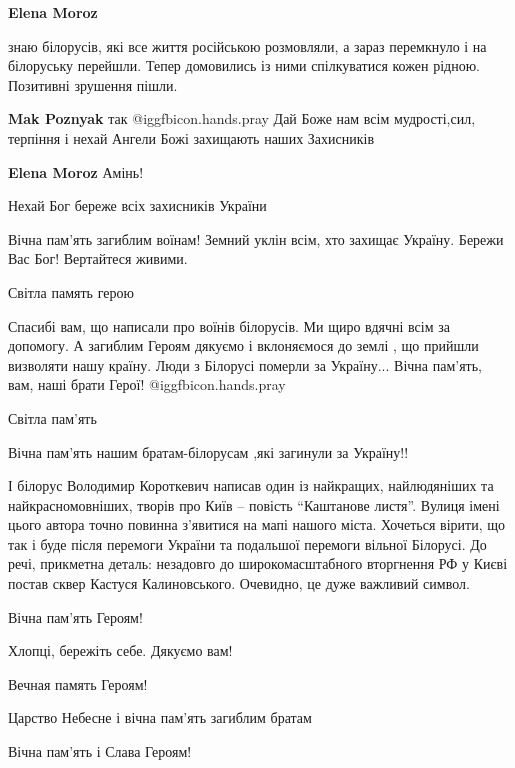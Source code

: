 \begin{itemize}
\begin{itemize}
\textbf{Elena Moroz} 

знаю білорусів, які все життя російською розмовляли, а зараз перемкнуло і на
білоруську перейшли. Тепер домовились із ними спілкуватися кожен рідною.
Позитивні зрушення пішли.

\textbf{Mak Poznyak} так
 @igg{fbicon.hands.pray} Дай Боже нам всім мудрості,сил, терпіння і нехай Ангели Божі захищають наших Захисників

\textbf{Elena Moroz} Амінь!
\end{itemize} %

Нехай Бог береже всіх захисників України

Вічна пам'ять загиблим воїнам! Земний уклін всім, хто захищає Україну. Бережи Вас Бог! Вертайтеся живими.

Світла память герою


Спасибі вам, що написали про воїнів білорусів. Ми щиро вдячні всім за допомогу.
А загиблим Героям дякуємо і вклоняємося до землі , що прийшли визволяти нашу
країну. Люди з Білорусі померли за Україну... Вічна пам'ять, вам, наші брати
Герої!  @igg{fbicon.hands.pray} 


Світла пам'ять

Вічна пам'ять нашим братам-білорусам ,які загинули за Україну!!


І білорус Володимир Короткевич написав один із найкращих, найлюдяніших та
найкрасномовніших, творів про Київ – повість \enquote{Каштанове листя}. Вулиця імені
цього автора точно повинна з'явитися на мапі нашого міста. Хочеться вірити, що
так і буде після перемоги України та подальшої перемоги вільної Білорусі. До
речі, прикметна деталь: незадовго до широкомасштабного вторгнення РФ у Києві
постав сквер Кастуся Калиновського. Очевидно, це дуже важливий символ.

Вічна пам'ять Героям!

Хлопці, бережіть себе. Дякуємо вам!

Вечная память Героям!

Царство Небесне і вічна пам'ять загиблим братам

Вічна пам'ять і Слава Героям!


\end{itemize}
